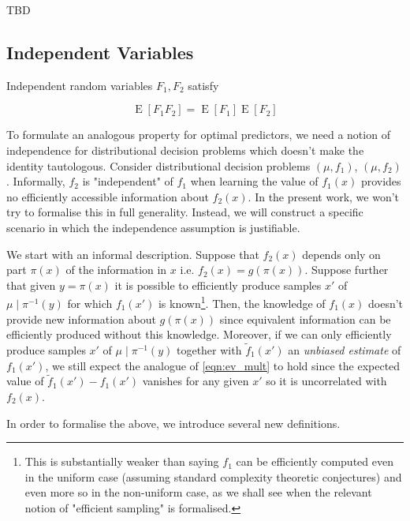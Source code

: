 \documentclass{article}
\numberwithin{equation}{section}
\theoremstyle{definition}
\theoremstyle{plain}
\DeclareMathOperator{\E}{E}
\begin{document}
TBD

\subsection{Independent Variables}

Independent random variables $F_1, F_2$ satisfy 

\begin{equation}
\label{eqn:ev_mult}
\E[F_1 F_2] = \E[F_1] \E[F_2]
\end{equation}

To formulate an analogous property for optimal predictors, we need a notion of independence for distributional decision problems which doesn't make the identity tautologous. Consider distributional decision problems $(\mu, f_1)$, $(\mu, f_2)$. Informally, $f_2$ is "independent" of $f_1$ when learning the value of $f_1(x)$ provides no efficiently accessible information about $f_2(x)$. In the present work, we won't try to formalise this in full generality. Instead, we will construct a specific scenario in which the independence assumption is justifiable.

We start with an informal description. Suppose that $f_2(x)$ depends only on part $\pi(x)$ of the information in $x$ i.e. $f_2(x) = g(\pi(x))$. Suppose further that given $y=\pi(x)$ it is possible to efficiently produce samples $x'$ of $\mu \mid \pi^{-1}(y)$ for which $f_1(x')$ is known\footnote{This is substantially weaker than saying $f_1$ can be efficiently computed even in the uniform case (assuming standard complexity theoretic conjectures) and even more so in the non-uniform case, as we shall see when the relevant notion of "efficient sampling" is formalised.}. Then, the knowledge of $f_1(x)$ doesn't provide new information about $g(\pi(x))$ since equivalent information can be efficiently produced without this knowledge.
 Moreover, if we can only efficiently produce samples $x'$ of $\mu \mid \pi^{-1}(y)$ together with $\tilde{f}_1(x')$ an \emph{unbiased estimate} of $f_1(x')$, we still expect the analogue of \ref{eqn:ev_mult} to hold since the expected value of $\tilde{f}_1(x') - f_1(x')$ vanishes for any given $x'$ so it is uncorrelated with $f_2(x)$.
 
In order to formalise the above, we introduce several new definitions.
\end{document}
